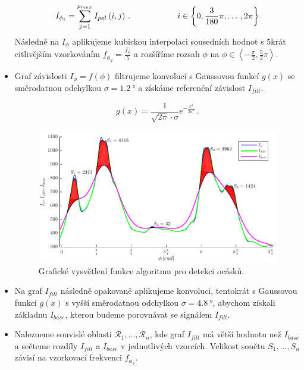 \begin{itemize}
	\begin{equation}
	I_{\phi_i} = \sum_{j = 1}^{\rho_{max}} I_{pol}\left(i,j\right)\,. \hspace*{2cm} i \in \left\lbrace 0, \frac{3}{180}\pi, \dots \,,2\pi \right\rbrace
	\label{eq:Isuma}
	\end{equation}
	Následně na $I_{\phi}$ aplikujeme kubickou interpolaci sousedních hodnot s $5$krát citlivějším vzorkováním $f_{\phi_2} = \frac{f_{\phi}}{5}$ a rozšíříme rozsah $\phi$ na $\phi \in \left\langle -\frac{\pi}{2},\frac{5}{2}\pi \right\rangle$. 
	
	\item Graf závislosti $I_\phi = f(\phi)$ filtrujeme konvolucí s Gaussovou funkcí $g(x)$ se směrodatnou odchylkou $\sigma = \SI{1.2}{\degree}$ a získáme referenční závislost $I_{filt}$.
	
	\begin{equation}
		g(x) = \frac{1}{\sqrt{2\pi} \cdot \sigma}e^{-\frac{x^2}{2\sigma^2}}\,.
	\end{equation}
	
	\begin{figure}[htbp]
    \centering\includegraphics[width=\textwidth]{figures/tailex05.pdf}
     \caption[Detekce ocásků - zpracování polárního grafu.]{Grafické vysvětlení funkce algoritmu pro detekci ocásků. }
    \label{fig:tailSumGraph}
	\end{figure}
	
	\item Na graf $I_{filt}$ následně opakovaně aplikujeme konvoluci, tentokrát s Gaussovou funkcí $g(x)$ s vyšší směrodatnou odchylkou $\sigma = \SI{4.8}{\degree}$, abychom získali základnu $I_{base}$, kterou budeme porovnávat se signálem $I_{filt}$.
	
	\item Nalezneme souvislé oblasti $\mathcal{R}_1, \dots , \mathcal{R}_n$, kde graf $I_{filt}$ má větší hodnotu než $I_{base}$ a sečteme rozdíly $I_{filt}$ a $I_{base}$ v jednotlivých vzorcích. Velikost součtu $S_1, \dots , S_n$ závisí na vzorkovací frekvenci $f_{\phi_2}$.
	

\end{itemize}
